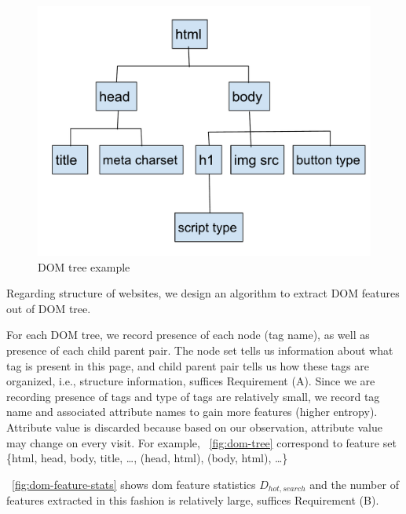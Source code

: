 
\begin{figure}[t]
  \centering
  \includegraphics[width=.5\textwidth]{fig/dom-tree}
  \caption{DOM tree example}
  \label{fig:dom-tree}
\end{figure}

Regarding structure of websites, we design an algorithm to extract DOM features
out of DOM tree.

For each DOM tree, we record presence of each node (tag name), as
well as presence of each child parent pair. The node set tells us information about what
tag is present in this page, and child parent pair tells us how these tags are
organized, i.e., structure information, suffices Requirement (A).
Since we are recording presence of tags and type of tags are relatively small,
we record tag name and associated attribute names to gain more features (higher
entropy).
Attribute value is discarded because based on our observation, attribute value
may change on every visit.
For example,
~\autoref{fig:dom-tree} correspond to feature set 
\{html, head, body, title, \ldots, (head, html), (body, html), \ldots \}

~\autoref{fig:dom-feature-stats} shows dom
feature statistics $D_{hot, search}$ and the number of features extracted in this
fashion is relatively large, suffices Requirement (B). 


